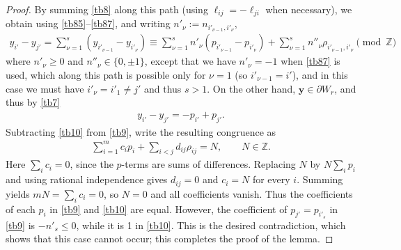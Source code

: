 \documentclass[11pt,reqno,tbtags,a4paper]{amsart}
\numberwithin{equation}{section}
\renewcommand\le{\leq}
\renewcommand\ge{\geq}
\renewcommand\leq{\leqslant}
\renewcommand\geq{\geqslant}
\theoremstyle{plain}%
\theoremstyle{definition}
\theoremstyle{remark}
\newcommand\set[1]{\ensuremath{\{#1\}}}
\newcommand\bbZ{\mathbb Z}
\newcounter{cc}
\newcommand\vy{\mathbf{y}}
\newcommand\dW{\partial W}
\newcommand\0{{\boldsymbol 0}}
\newcommand\1{{\boldsymbol 1}}
\begin{document}
\begin{proof}
By summing \eqref{tb8} along this path
(using $\ell_{ij}=-\ell_{ji}$ when necessary), we obtain using
\eqref{tb85}--\eqref{tb87}, and writing 
$n'_\nu:=n_{i'_{\nu-1},i'_\nu}$,
\begin{align}\label{tb9}
  y_{i'}-y_{j'} = \sum_{\nu=1}^s (y_{i'_{\nu-1}}-y_{i'_\nu})
\equiv \sum_{\nu=1}^s n'_\nu(p_{i'_{\nu-1}}-p_{i'_\nu}) 
+\sum_{\nu=1}^s n''_\nu\rho_{i'_{\nu-1},i'_\nu}
\pmod\bbZ
\end{align}
where $n'_\nu\ge0$ and $n''_\nu\in\set{0,\pm1}$,
except that we have $n'_\nu=-1$ when \eqref{tb87} is used, 
which along this  path is possible only for $\nu=1$ (so $i'_{\nu-1}=i'$), 
and in this case we must have $i'_\nu=i'_1\neq j'$ and thus $s>1$.
On the other hand, $\vy\in\dW_r$, and thus by \eqref{tb7}
\begin{align}\label{tb10}
  y_{i'}-y_{j'}=-p_{i'}+p_{j'}.
\end{align}
Subtracting \eqref{tb10} from \eqref{tb9}, write the resulting congruence as
\begin{align}
 \sum_{i=1}^m c_i p_i+\sum_{i<j}d_{ij}\rho_{ij}=N,
 \qquad N\in\bbZ.  
\end{align}
Here $\sum_i c_i=0$, since the $p$-terms are sums of differences.
Replacing $N$ by $N\sum_i p_i$ and using rational independence gives
$d_{ij}=0$ and $c_i=N$ for every $i$. Summing yields $mN=\sum_i c_i=0$,
so $N=0$ and all coefficients vanish.
Thus the coefficients of each $p_i$ in \eqref{tb9} and \eqref{tb10}
are equal.
However, %
the coefficient of $p_{j'}=p_{i'_s}$ in \eqref{tb9} is $-n'_s\le0$,
while it is 1 in \eqref{tb10}.
This is the desired contradiction, which shows that this case 
cannot occur; this completes the proof of the lemma.
\end{proof}
\end{document}
